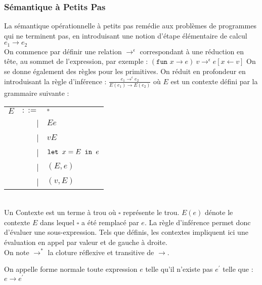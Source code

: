 \documentclass{cours}
\begin{document}
\subsubsection{Sémantique à Petits Pas}
La sémantique opérationnelle à petits pas remédie aux problèmes de programmes qui ne terminent pas, en introduisant une notion d'étape élémentaire de calcul $e_{1} \rightarrow e_{2}$\\
On commence par définir une relation $\rightarrow^{\epsilon}$ correspondant à une réduction en tête, au sommet de l'expression, par exemple : $(\texttt{fun } x\rightarrow e)\ v \rightarrow^{\epsilon} e[x \leftarrow v]$
On se donne également des règles pour les primitives. On réduit en profondeur en introduisant la règle d'inférence : $\frac{e_{1}\rightarrow^{\epsilon} e_{2}}{E(e_{1})\rightarrow E(e_{2})}$ où $E$ est un contexte défini par la grammaire suivante :
\begin{tabular}{crl}
    $E$ & $::=$ & $\square$         \\
        & |     & $E e$             \\
        & |     & $v E$             \\
        & |     & $\texttt{let } x = E \texttt{ in } e$ \\
        & |     & $(E, e)$          \\
        & |     & $(v, E)$          \\
\end{tabular}\\
Un Contexte est un terme à trou où $\square$ représente le trou. $E(e)$ dénote le contexte $E$ dans lequel $\square$ a été remplacé par $e$. La règle d'inférence permet donc d'évaluer une sous-expression. Tels que définis, les contextes impliquent ici une évaluation en appel par valeur et de gauche à droite. \\
On note $\rightarrow^{*}$ la cloture réflexive et transitive de $\rightarrow$.
\begin{definition}
    On appelle forme normale toute expression $e$ telle qu'il n'existe pas $e^{'}$ telle que : $e \rightarrow e^{'}$
\end{definition}
\end{document}
